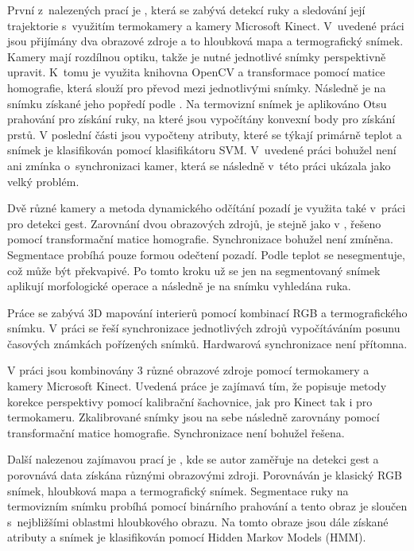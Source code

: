     První z~nalezených prací je \cite{saba2012dante}, která se zabývá detekcí ruky a sledování její trajektorie s~využitím termokamery a kamery Microsoft Kinect. V~uvedené práci jsou přijímány dva obrazové zdroje a to hloubková mapa a termografický snímek. Kamery mají rozdílnou optiku, takže je nutné jednotlivé snímky perspektivně upravit. K~tomu je využita knihovna OpenCV a transformace pomocí matice homografie, která slouží pro převod mezi jednotlivými snímky. Následně je na snímku získané jeho popředí podle \cite{opencvMOG}. Na termovizní snímek je aplikováno Otsu prahování \cite{otsu1975threshold} pro získání ruky, na které jsou vypočítány konvexní body pro získání prstů. V poslední části jsou vypočteny atributy, které se týkají primárně teplot a snímek je klasifikován pomocí klasifikátoru SVM. V~uvedené práci bohužel není ani zmínka o~synchronizaci kamer, která se následně v~této práci ukázala jako velký problém.
    
    Dvě různé kamery a metoda dynamického odčítání pozadí je využita také v~práci \cite{zeng2012hand} pro detekci gest. Zarovnání dvou obrazových zdrojů, je stejně jako v \cite{saba2012dante}, řešeno pomocí transformační matice homografie. Synchronizace bohužel není zmíněna. Segmentace probíhá pouze formou odečtení pozadí. Podle teplot se nesegmentuje, což může být překvapivé. Po tomto kroku už se jen na segmentovaný snímek aplikují morfologické operace \cite{serra1982image} a následně je na snímku vyhledána ruka.
    
    Práce \cite{vidas20133d} se zabývá 3D mapování interierů pomocí kombinací RGB a termografického snímku. V práci se řeší synchronizace jednotlivých zdrojů vypočítáváním posunu časových známkách pořízených snímků. Hardwarová synchronizace není přítomna.
    
    V práci \cite{palmero2016multi} jsou kombinovány 3 různé obrazové zdroje pomocí termokamery a kamery Microsoft Kinect. Uvedená práce je zajímavá tím, že popisuje metody korekce perspektivy pomocí kalibrační šachovnice, jak pro Kinect tak i pro termokameru. Zkalibrované snímky jsou na sebe následně zarovnány pomocí transformační matice homografie. Synchronizace není bohužel řešena.
    
	Další nalezenou zajímavou prací je \cite{appenrodt2010data}, kde se autor zaměřuje na detekci gest a porovnává data získána různými obrazovými zdroji. Porovnáván je klasický RGB snímek, hloubková mapa a termografický snímek. Segmentace ruky na termovizním snímku probíhá pomocí binárního prahování a tento obraz je sloučen s~nejbližšími oblastmi hloubkového obrazu. Na tomto obraze jsou dále získané atributy a snímek je klasifikován pomocí Hidden Markov Models (HMM).

